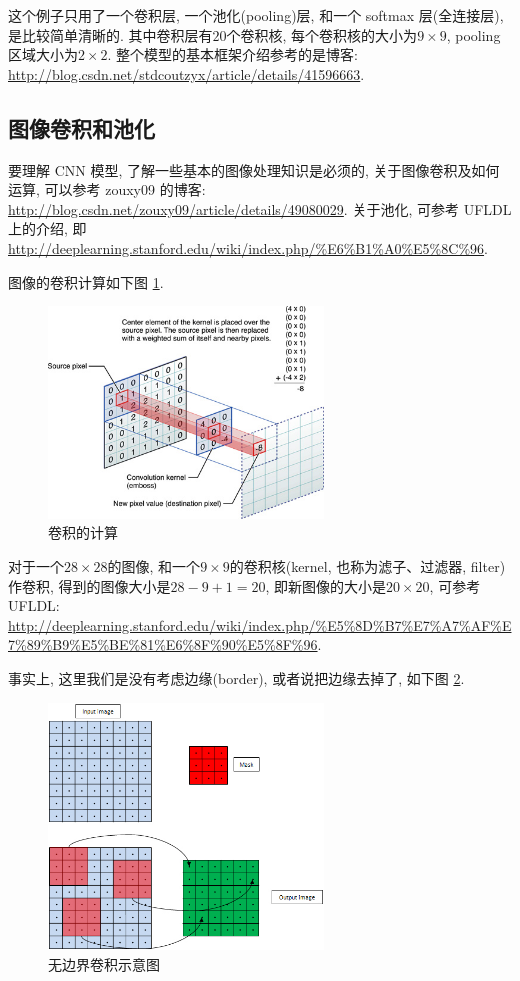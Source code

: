 \documentclass[a4paper,UTF8]{ctexart}
\theoremstyle{plain} \newtheorem{theorem}{定理}[section]
\theoremstyle{plain} \newtheorem{definition}{定义}[section]
\theoremstyle{plain} \newtheorem{lemma}{引理}[section]
\theoremstyle{plain} \newtheorem{proposition}{命题}[section]
\theoremstyle{plain} \newtheorem{example}{例}[section]
\theoremstyle{plain} \newtheorem{remark}{注}[section]
\theoremstyle{plain} \newtheorem{corollary}{推论}[section]
\begin{document}
这个例子只用了一个卷积层, 一个池化(pooling)层, 和一个 softmax 层(全连接层), 是比较简单清晰的. 其中卷积层有$20$个卷积核, 每个卷积核的大小为$9 \times 9$, pooling 区域大小为$2 \times 2$. 整个模型的基本框架介绍参考的是博客: \url{http://blog.csdn.net/stdcoutzyx/article/details/41596663}.

\subsection{图像卷积和池化}
要理解 CNN 模型, 了解一些基本的图像处理知识是必须的, 关于图像卷积及如何运算, 可以参考 zouxy09 的博客: \url{http://blog.csdn.net/zouxy09/article/details/49080029}. 关于池化, 可参考 UFLDL 上的介绍, 即 \url{http://deeplearning.stanford.edu/wiki/index.php/%E6%B1%A0%E5%8C%96}.

图像的卷积计算如下图 \ref{cal-convole}.
\begin{figure}[!htb]
	\centering
	\includegraphics[width=0.65\textwidth]{kernel_convolution.jpg}
	\caption{卷积的计算}
	\label{cal-convole}
\end{figure}

对于一个$28 \times 28$的图像, 和一个$9 \times 9$的卷积核(kernel, 也称为滤子、过滤器, filter)作卷积, 得到的图像大小是$28 - 9 + 1 = 20$, 即新图像的大小是$20 \times 20$, 可参考 UFLDL: \url{http://deeplearning.stanford.edu/wiki/index.php/%E5%8D%B7%E7%A7%AF%E7%89%B9%E5%BE%81%E6%8F%90%E5%8F%96}.

事实上, 这里我们是没有考虑边缘(border), 或者说把边缘去掉了, 如下图 \ref{noborder}.
\begin{figure}[!htb]
	\centering
	\includegraphics[width=0.65\textwidth]{convolution_trans.jpeg}
	\caption{无边界卷积示意图}
	\label{noborder}
\end{figure}
\end{document}

